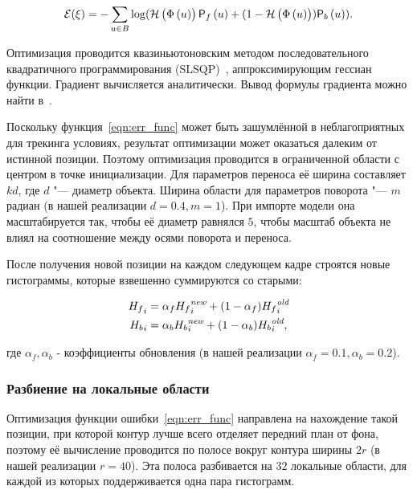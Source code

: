 \begin{equation}
\label{eqn:err_func}
\mathcal{E}(\xi) = - \sum\limits_{\mathnormal{u} \in B}
\log(\mathcal{H} \left( \Phi \left( \mathnormal{u} \right) \right) \mathsf{P}_f \left( \mathnormal{u} \right) + (1 - \mathcal{H} \left( \Phi \left( \mathnormal{u} \right) \right))\mathsf{P}_b \left( \mathnormal{u} \right))
\text{.}
\end{equation}

Оптимизация проводится квазиньютоновским методом последовательного
квадратичного
программирования (SLSQP)~\cite{SLSQP}, аппроксимирующим гессиан функции.
Градиент вычисляется аналитически.
Вывод формулы градиента можно найти в~\cite{Tjaden2018}.

Поскольку функция~\ref{eqn:err_func} может быть зашумлённой в неблагоприятных
для трекинга условиях, результат оптимизации может оказаться далеким от
истинной позиции.
Поэтому оптимизация проводится в ограниченной области с центром в точке
инициализации.
Для параметров переноса её ширина составляет $kd$, где $d$ "--- диаметр
объекта.
Ширина области для параметров поворота "--- $m$ радиан (в нашей реализации $d =0.4, m = 1$).
При импорте модели она масштабируется так, чтобы её диаметр равнялся $5$,
чтобы масштаб объекта не влиял на соотношение между осями поворота и переноса.

После получения новой позиции на каждом следующем кадре строятся новые
гистограммы, которые взвешенно суммируются со старыми: 

\begin{align}
{\ensuremath{H_f}}_i &= \alpha_f {H_f}_i^{\text{\it new}} + (1 - \alpha_f)
{H_f}_i^{\text{\it old}} \\{H_b}_i &= \alpha_b
{H_b}_i^{\text{\it new}} + (1 - \alpha_b) {H_b}_i^{\text{\it
old}}\text{,}
\end{align}

где $\alpha_f, \alpha_b$ - коэффициенты обновления (в нашей реализации
$\alpha_f = 0.1, \alpha_b = 0.2$).

\subsubsection*{Разбиение на локальные области}

Оптимизация функции ошибки~\ref{eqn:err_func} направлена на нахождение такой
позиции, при которой контур лучше всего отделяет передний план от фона, поэтому 
её вычисление проводится по полосе вокруг контура ширины $2r$ (в нашей
реализации $r = 40$).
Эта полоса разбивается на $32$ локальные области, для каждой из
которых поддерживается одна пара гистограмм.

